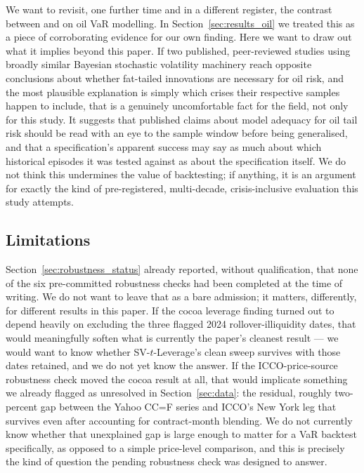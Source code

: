 \documentclass[preprint,12pt,authoryear]{elsarticle}
\begin{document}
We want to revisit, one further time and in a different register, the contrast between \citet{chenzerillibaum2019} and \citet{kuang2022} on oil VaR modelling. In Section~\ref{sec:results_oil} we treated this as a piece of corroborating evidence for our own finding. Here we want to draw out what it implies beyond this paper. If two published, peer-reviewed studies using broadly similar Bayesian stochastic volatility machinery reach opposite conclusions about whether fat-tailed innovations are necessary for oil risk, and the most plausible explanation is simply which crises their respective samples happen to include, that is a genuinely uncomfortable fact for the field, not only for this study. It suggests that published claims about model adequacy for oil tail risk should be read with an eye to the sample window before being generalised, and that a specification's apparent success may say as much about which historical episodes it was tested against as about the specification itself. We do not think this undermines the value of backtesting; if anything, it is an argument for exactly the kind of pre-registered, multi-decade, crisis-inclusive evaluation this study attempts.

\subsection{Limitations}

Section~\ref{sec:robustness_status} already reported, without qualification, that none of the six pre-committed robustness checks had been completed at the time of writing. We do not want to leave that as a bare admission; it matters, differently, for different results in this paper. If the cocoa leverage finding turned out to depend heavily on excluding the three flagged 2024 rollover-illiquidity dates, that would meaningfully soften what is currently the paper's cleanest result --- we would want to know whether SV-$t$-Leverage's clean sweep survives with those dates retained, and we do not yet know the answer. If the ICCO-price-source robustness check moved the cocoa result at all, that would implicate something we already flagged as unresolved in Section~\ref{sec:data}: the residual, roughly two-percent gap between the Yahoo CC=F series and ICCO's New York leg that survives even after accounting for contract-month blending. We do not currently know whether that unexplained gap is large enough to matter for a VaR backtest specifically, as opposed to a simple price-level comparison, and this is precisely the kind of question the pending robustness check was designed to answer.
\end{document}
